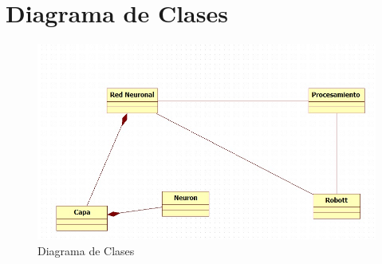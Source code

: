 \section{Diagrama de Clases}
\begin{figure}
	\centering
	\includegraphics[width=4.5in]{imagen11.jpg}
	
	\caption{Diagrama de Clases}
	\label{fig_mar}
\end{figure}